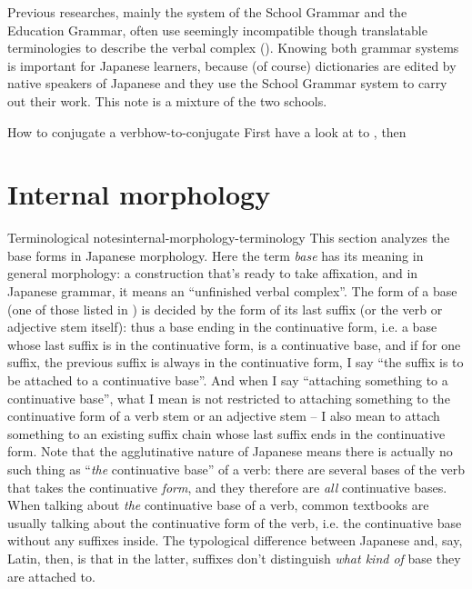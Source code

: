 \documentclass[UTF8, a4paper, oneside, scheme=plain]{ctexrep}
\newcommand*{\term}[1]{\emph{#1}}
\begin{document}
Previous researches, mainly the system of the School Grammar and the Education Grammar,
often use seemingly incompatible though translatable terminologies 
to describe the verbal complex ().
Knowing both grammar systems is important for Japanese learners,
because (of course) dictionaries are edited by native speakers of Japanese
and they use the School Grammar system to carry out their work.
This note is a mixture of the two schools.

\begin{learnbox}{How to conjugate a verb}{how-to-conjugate}
    First have a look at  to ,
    then 
\end{learnbox}

\section{Internal morphology}\label{sec:conjugation-class}

\begin{theorybox}{Terminological notes}{internal-morphology-terminology}
    This section analyzes the base forms in Japanese morphology.
    Here the term \term{base} has its meaning in general morphology:
    a construction that's ready to take affixation,
    and in Japanese grammar, it means an ``unfinished verbal complex''.
    The form of a base (one of those listed in ) 
    is decided by the form of its last suffix 
    (or the verb or adjective stem itself):
    thus a base ending in the continuative form, 
    i.e. a base whose last suffix is in the continuative form,
    is a continuative base,
    and if for one suffix, the previous suffix is always in the continuative form,
    I say ``the suffix is to be attached to a continuative base''.
    And when I say ``attaching something to a continuative base'',
    what I mean is not restricted to 
    attaching something to the continuative form of a verb stem or an adjective stem 
    -- I also mean to attach something to an existing suffix chain 
    whose last suffix ends in the continuative form.
    Note that the agglutinative nature of Japanese means 
    there is actually no such thing as 
    ``\emph{the} continuative base'' of a verb:
    there are several bases of the verb that takes the continuative \emph{form},
    and they therefore are \emph{all} continuative bases.
    When talking about \emph{the} continuative base of a verb,
    common textbooks are usually talking about the continuative form of the verb,
    i.e. the continuative base without any suffixes inside.
    The typological difference between Japanese and, say, Latin, then,
    is that in the latter, suffixes don't distinguish \emph{what kind of} base they are attached to.
\end{theorybox}
\end{document}
